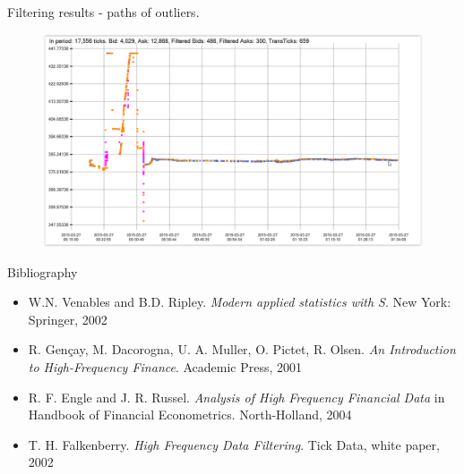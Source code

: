 \documentclass{beamer}
\begin{document}
\begin{frame}{Filtering results - paths of outliers.}

\begin{figure}
    \centering
    \includegraphics[width=1\textwidth]{../wykresy/pathsgj.PNG}
\end{figure}

\end{frame}

\begin{frame}{Bibliography}
\begin{itemize}
\item W.N. Venables and B.D. Ripley. \emph{Modern applied statistics with S}. New York: Springer, 2002
\item R. Gençay, M. Dacorogna, U. A. Muller, O. Pictet, R. Olsen. \emph{An Introduction to High-Frequency Finance}. Academic Press, 2001
\item  R. F. Engle and J. R. Russel. \emph{Analysis of High Frequency Financial Data} in Handbook of Financial Econometrics. North-Holland, 2004
\item T. H. Falkenberry. \emph{High Frequency Data Filtering}.  Tick Data, white paper, 2002
\end{itemize}


\end{frame}
\end{document}
